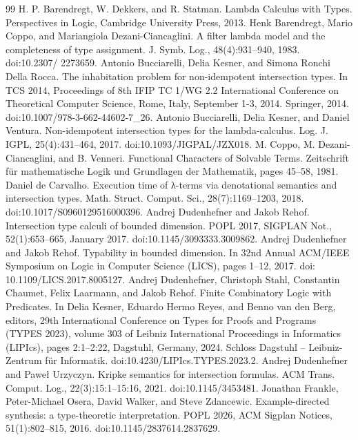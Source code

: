 \begin{thebibliography}{99}
 H. P. Barendregt, W. Dekkers, and R. Statman. Lambda Calculus with Types. Perspectives in Logic, Cambridge University Press, 2013.
 Henk Barendregt, Mario Coppo, and Mariangiola Dezani-Ciancaglini. A filter lambda model and the completeness of type assignment. J. Symb. Log., 48(4):931–940, 1983. doi:10.2307/ 2273659.
 Antonio Bucciarelli, Delia Kesner, and Simona Ronchi Della Rocca. The inhabitation problem for non-idempotent intersection types. In TCS 2014, Proceedings of 8th IFIP TC 1/WG 2.2 International Conference on Theoretical Computer Science, Rome, Italy, September 1-3, 2014. Springer, 2014. doi:10.1007/978-3-662-44602-7\_26.
 Antonio Bucciarelli, Delia Kesner, and Daniel Ventura. Non-idempotent intersection types for the lambda-calculus. Log. J. IGPL, 25(4):431–464, 2017. doi:10.1093/JIGPAL/JZX018.
 M. Coppo, M. Dezani-Ciancaglini, and B. Venneri. Functional Characters of Solvable Terms. Zeitschrift für mathematische Logik und Grundlagen der Mathematik, pages 45–58, 1981.
 Daniel de Carvalho. Execution time of λ-terms via denotational semantics and intersection types. Math. Struct. Comput. Sci., 28(7):1169–1203, 2018. doi:10.1017/S0960129516000396.
 Andrej Dudenhefner and Jakob Rehof. Intersection type calculi of bounded dimension. POPL 2017, SIGPLAN Not., 52(1):653–665, January 2017. doi:10.1145/3093333.3009862.
 Andrej Dudenhefner and Jakob Rehof. Typability in bounded dimension. In 32nd Annual ACM/IEEE Symposium on Logic in Computer Science (LICS), pages 1–12, 2017. doi: 10.1109/LICS.2017.8005127.
 Andrej Dudenhefner, Christoph Stahl, Constantin Chaumet, Felix Laarmann, and Jakob Rehof. Finite Combinatory Logic with Predicates. In Delia Kesner, Eduardo Hermo Reyes, and Benno van den Berg, editors, 29th International Conference on Types for Proofs and Programs (TYPES 2023), volume 303 of Leibniz International Proceedings in Informatics (LIPIcs), pages 2:1–2:22, Dagstuhl, Germany, 2024. Schloss Dagstuhl – Leibniz-Zentrum für Informatik. doi:10.4230/LIPIcs.TYPES.2023.2.
 Andrej Dudenhefner and Paweł Urzyczyn. Kripke semantics for intersection formulas. ACM Trans. Comput. Log., 22(3):15:1–15:16, 2021. doi:10.1145/3453481.
 Jonathan Frankle, Peter-Michael Osera, David Walker, and Steve Zdancewic. Example-directed synthesis: a type-theoretic interpretation. POPL 2026, ACM Sigplan Notices, 51(1):802–815, 2016. doi:10.1145/2837614.2837629.

\end{thebibliography}
